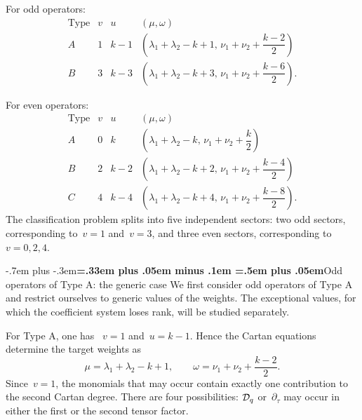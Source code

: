 \documentclass[12pt,a4paper]{amsart}
\makeatletter
\providecommand{\headspaces}{\spaceskip=.33em plus .05em minus .1em \xspaceskip=.5em plus .05em}
\def\subsection{\@startsection{subsection}{2}{0pt}{-1ex \@plus -.4ex \@minus -.2ex}%
  {-.7em plus -.3em}{\normalfont\normalsize\bfseries\boldmath\headspaces}}
\theoremstyle{thm}
\theoremstyle{definition}
\newcommand {\Dq}{\cD_q}
\makeatother
\begin{document}
For odd operators:
\[
\begin{array}{c|c|c|c}
\text{Type} & v & u & (\mu,\omega)
\\ \hline
A
&
1
&
k-1
&
\left(
\lambda_1+\lambda_2-k+1,\,
\nu_1+\nu_2+\dfrac{k-2}{2}
\right)
\\[3mm]
B
&
3
&
k-3
&
\left(
\lambda_1+\lambda_2-k+3,\,
\nu_1+\nu_2+\dfrac{k-6}{2}
\right).
\end{array}
\]

For even operators:
\[
\begin{array}{c|c|c|c}
\text{Type} & v & u & (\mu,\omega)
\\ \hline
A
&
0
&
k
&
\left(
\lambda_1+\lambda_2-k,\,
\nu_1+\nu_2+\dfrac{k}{2}
\right)
\\[3mm]
B
&
2
&
k-2
&
\left(
\lambda_1+\lambda_2-k+2,\,
\nu_1+\nu_2+\dfrac{k-4}{2}
\right)
\\[3mm]
C
&
4
&
k-4
&
\left(
\lambda_1+\lambda_2-k+4,\,
\nu_1+\nu_2+\dfrac{k-8}{2}
\right).
\end{array}
\]
The classification problem splits into five independent
sectors: two odd sectors, corresponding to~$v=1$ and~$v=3$, and three
even sectors, corresponding to~$v=0,2,4$.

\subsection{Odd operators of Type A: the generic case}
\label{subsubsec:odd-typeA}
We first consider odd operators of Type A and restrict ourselves to
generic values of the weights. The exceptional values, for which the
coefficient system loses rank, will be studied separately.

For Type A, one has~%
$
v=1$ and~$u=k-1.$ Hence the Cartan equations determine the target weights as
\[
\mu=\lambda_1+\lambda_2-k+1,
\qquad
\omega=\nu_1+\nu_2+\frac{k-2}{2}.
\]
Since~\(v=1\), the monomials that may occur contain exactly one
contribution to the second Cartan degree. There are four possibilities:
\(\Dq\) or~\(\partial_\tau\) may occur in either the first or the second tensor
factor.
\end{document}
